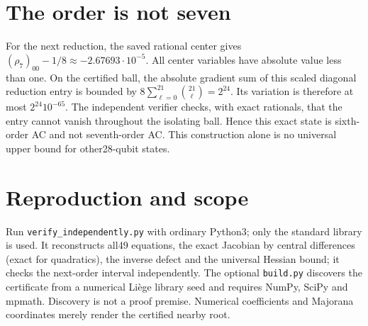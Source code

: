 \documentclass[11pt]{article}
\begin{document}
\section*{The order is not seven}
For the next reduction, the saved rational center gives
$(\rho_7)_{00}-1/8\approx-2.67693\cdot10^{-5}$.
All center variables have absolute value less than one. On the certified
ball, the absolute gradient sum of this scaled diagonal reduction entry
is bounded by $8\sum_{\ell=0}^{21}\binom{21}\ell=2^{24}$.
Its variation is therefore at most $2^{24}10^{-65}$.
The independent verifier checks, with exact rationals, that the entry
cannot vanish throughout the isolating ball. Hence this exact state is
sixth-order AC and not seventh-order AC. This construction alone is no
universal upper bound for other28-qubit states.

\section*{Reproduction and scope}
Run \texttt{verify\_independently.py} with ordinary Python3; only the standard
library is used. It reconstructs all49 equations, the exact Jacobian by
central differences (exact for quadratics), the inverse defect and the
universal Hessian bound; it checks the next-order interval independently.
The optional \texttt{build.py} discovers the certificate from a numerical
Li\`ege library seed and requires NumPy, SciPy and mpmath. Discovery is not
a proof premise. Numerical coefficients and Majorana coordinates merely
render the certified nearby root.
\end{document}
